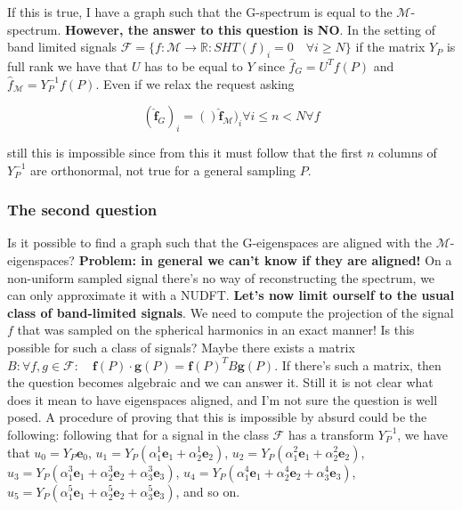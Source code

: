 If this is true, I have a graph such that the G-spectrum is equal to the $\mathcal M$-spectrum. \textbf{However, the answer to this question is NO}. 
In the setting of band limited signals $\mathcal F = \{f: \mathcal M \rightarrow \mathbb R: SHT(f)_i = 0\quad \forall i \geq N \}$  if the matrix $Y_P$ is full rank we have that $U$ has to be equal to $Y$ since $\hat f_G = U^Tf(P)$ and $\hat f_\mathcal M = Y_P^{-1}f(P)$. Even if we relax the request asking

$$(\mathbf{\hat f}_{G})_i = ()\mathbf{\hat f}_{\mathcal M})_i \forall i \leq n<N \forall f$$

still this is impossible since from this it must follow that the first $n$ columns of $Y^{-1}_P$ are orthonormal, not true for a general sampling $P$.


\subsubsection*{The second question}
Is it possible to find a graph such that the G-eigenspaces are aligned with the $\mathcal M$-eigenspaces? \textbf{Problem: in general we can't know if they are aligned!} On a non-uniform sampled signal there's no way of reconstructing the spectrum, we can only approximate it with a NUDFT. \textbf{Let's now limit ourself to the usual class of band-limited signals}. We need to compute the projection of the signal $f$ that was sampled on the spherical harmonics in an exact manner! Is this possible for such a class of signals? Maybe there exists a matrix $B: \forall f,g \in \mathcal F:\quad  \mathbf f(P)\cdot\mathbf g(P) = \mathbf f(P)^TB\mathbf g(P)$. If there's such a matrix, then the question becomes algebraic and we can answer it. Still it is not clear what does it mean to have eigenspaces aligned, and I'm not sure the question is well posed.
A procedure of proving that this is impossible by absurd could be the following: following that for a signal in the class $\mathcal F$ has a transform $Y_P^{-1}$, we have that $u_0 = Y_P \mathbf e_0$, $u_1 = Y_P(\alpha_1^1 \mathbf e_1 + \alpha_2^1 \mathbf e_2)$, $u_2 = Y_P(\alpha_1^2 \mathbf e_1 + \alpha_2^2 \mathbf e_2)$, $u_3 = Y_P(\alpha_1^3 \mathbf e_1 + \alpha_2^3 \mathbf e_2+ \alpha_3^3 \mathbf e_3)$, $u_4 = Y_P(\alpha_1^4 \mathbf e_1 + \alpha_2^4 \mathbf e_2+ \alpha_3^4 \mathbf e_3)$, $u_5 = Y_P(\alpha_1^5 \mathbf e_1 + \alpha_2^5 \mathbf e_2+ \alpha_3^5 \mathbf e_3)$, and so on.
